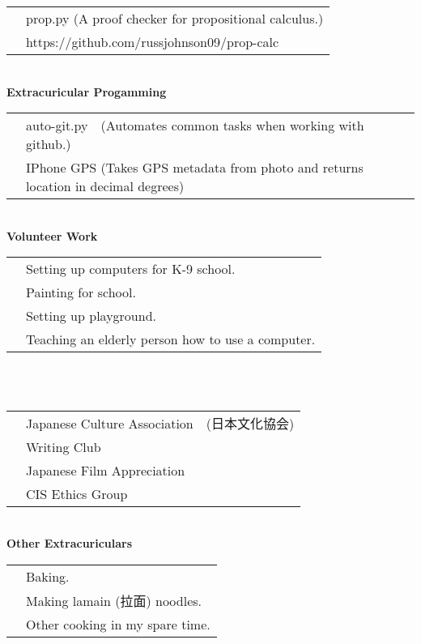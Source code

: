 \documentclass{article}
\newcommand{\blarge}[1] {{\bf\large #1}}
\begin{document}
\begin{tabular}{l@{\hskip 0.2\linewidth}l}
&	prop.py (A proof checker for propositional calculus.)	\\
&	https://github.com/russjohnson09/prop-calc				\\
\end{tabular}\\
\blarge{Extracuricular Progamming}\\  
\begin{tabular}{l@{\hskip 0.2\linewidth}l}
&	auto-git.py　(Automates common tasks when working with github.)	\\          
&	IPhone GPS (Takes GPS metadata from photo and returns location in decimal degrees)						\\
\end{tabular}\\
\blarge{Volunteer Work}\\
\begin{tabular}{l@{\hskip 0.2\linewidth}l}
&	Setting up computers for K-9 school.	\\          
&	Painting for school.     							\\      
&	Setting up playground.				\\
&	Teaching an elderly person how to use a computer.							\\
\end{tabular}\\
\noindent\blarge{Club Membership}\\       
\begin{tabular}{l@{\hskip 0.2\linewidth}l}
&	Japanese Culture Association　(日本文化協会)	\\          
&	Writing Club     							\\      
&	Japanese Film Appreciation 					\\
&	CIS Ethics Group							\\
\end{tabular}\\
\blarge{Other Extracuriculars}\\
\begin{tabular}{l@{\hskip 0.2\linewidth}l}
&	Baking.	\\          
&	Making lamain (拉面) noodles.		\\      
&	Other cooking in my spare time.				\\
\end{tabular}
\end{document}
